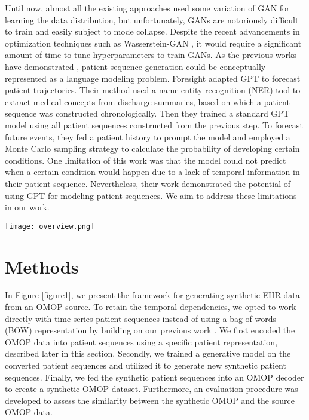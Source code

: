 \begin{multicols}{2}
Until now, almost all the existing approaches used some variation of GAN for learning the data distribution, but unfortunately, GANs are notoriously difficult to train and easily subject to mode collapse. Despite the recent advancements in optimization techniques such as Wasserstein-GAN \cite{Gulrajani2017}, it would require a significant amount of time to tune hyperparameters to train GANs. As the previous works have demonstrated \cite{Pang2021, Li2020, Rasmy2021}, patient sequence generation could be conceptually represented as a language modeling problem. Foresight \cite{Kraljevic2022} adapted GPT to forecast patient trajectories. Their method used a name entity recognition (NER) tool to extract medical concepts from discharge summaries, based on which a patient sequence was constructed chronologically. Then they trained a standard GPT model using all patient sequences constructed from the previous step. To forecast future events, they fed a patient history to prompt the model and employed a Monte Carlo sampling strategy to calculate the probability of developing certain conditions. One limitation of this work was that the model could not predict when a certain condition would happen due to a lack of temporal information in their patient sequence. Nevertheless, their work demonstrated the potential of using GPT for modeling patient sequences.  We aim to address these limitations in our work. 

\vspace{20pt}

\begin{Figure}
    \texttt{[image: overview.png]}
    \label{figure1}
\end{Figure}

\section{Methods}
In Figure \ref{figure1}, we present the framework for generating synthetic EHR data from an OMOP source. To retain the temporal dependencies, we opted to work directly with time-series patient sequences instead of using a bag-of-words (BOW) representation by building on our previous work \cite{Pang2021}. We first encoded the OMOP data into patient sequences using a specific patient representation, described later in this section. Secondly, we trained a generative model on the converted patient sequences and utilized it to generate new synthetic patient sequences. Finally, we fed the synthetic patient sequences into an OMOP decoder to create a synthetic OMOP dataset. Furthermore, an evaluation procedure was developed to assess the similarity between the synthetic OMOP and the source OMOP data.


\end{multicols}
